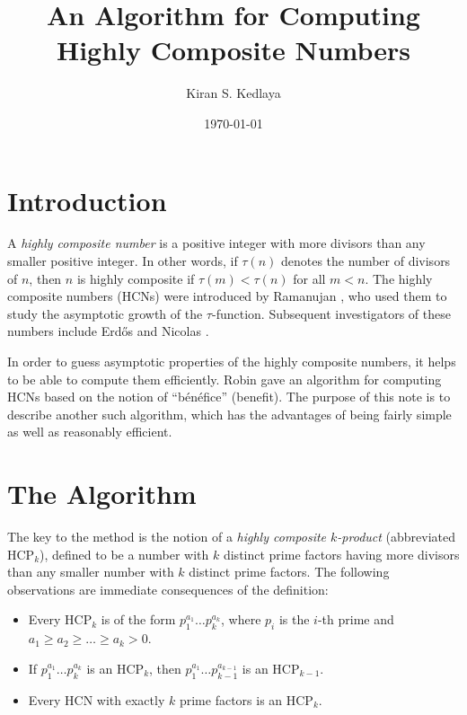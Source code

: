 \documentclass[12pt]{article}
\title{An Algorithm for Computing Highly Composite Numbers}
\author{Kiran S. Kedlaya}
\date{\today}
\begin{document}

\maketitle

\section{Introduction}
A \emph{highly composite number} is a positive integer with more 
divisors than any smaller positive integer. In other words, if 
$\tau(n)$ denotes the number of divisors of $n$, then $n$ is highly 
composite if $\tau(m) < \tau(n)$ for all $m < n$. The highly composite 
numbers (HCNs) were introduced by Ramanujan \cite{ram}, who used them 
to study the asymptotic growth of the $\tau$-function. Subsequent 
investigators of these numbers include Erd\H{o}s \cite{erd} and 
Nicolas \cite{nic}.

In order to guess asymptotic properties of the highly composite 
numbers, it helps to be able to compute them efficiently. Robin 
\cite{rob} gave an algorithm for computing HCNs based on the notion of 
``b\'en\'efice'' (benefit). The purpose of this note is to describe 
another such algorithm, which has the advantages of being fairly 
simple as well as reasonably efficient.

\section{The Algorithm}

The key to the method is the notion of a {\it highly composite
$k$-product\/} (abbreviated HCP$_k$), defined to be a number with $k$
distinct prime factors having more divisors than any smaller number
with $k$ distinct prime factors. The following observations are
immediate consequences of the definition:
\begin{itemize}
\item
Every HCP$_k$ is of the form $p_1^{a_1}\dots p_k^{a_k}$, where
$p_i$ is the $i$-th prime and $a_1 \geq a_2 \geq \dots \geq a_k > 0$.
\item
If $p_1^{a_1}\dots p_k^{a_k}$ is an HCP$_k$, then 
$p_1^{a_1}\dots p_{k-1}^{a_{k-1}}$ is an HCP$_{k-1}$.
\item
Every HCN
with exactly $k$ prime factors is an HCP$_k$.
\end{itemize}
\end{document}

